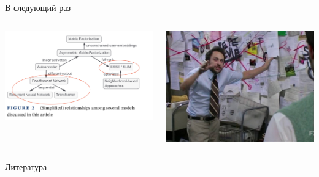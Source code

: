 \documentclass[11pt,aspectratio=169,handout]{beamer}
\begin{document}
\begin{frame}{В следующий раз}

\begin{columns}

\begin{column}{0.47\textwidth} 
\begin{center}
\includegraphics[scale=0.3]{images/relationships.png}
\end{center}
\end{column}

\begin{column}{0.47\textwidth}
\begin{center}
\includegraphics[scale=0.15]{images/conspiracy.jpeg}
\end{center}
\end{column}

\end{columns}

\end{frame}

\begin{frame}[allowframebreaks]{Литература}




\end{frame}
\end{document}

